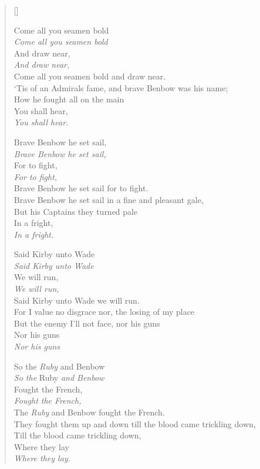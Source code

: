 \pagebreak
\settowidth{\versewidth}{‘Tis of an Admirals fame, and brave Benbow was his name;}
\begin{verse}[\versewidth]
\begin{patverse}
Come all you seamen bold\\
\textit{Come all you seamen bold}\\
And draw near,\\
\textit{And draw near,}\\
Come all you seamen bold and draw near.\\
‘Tis of an Admirals fame, and brave Benbow was his name;\\
How he fought all on the main \\
You shall hear,\\
\textit{You shall hear.}
\end{patverse}

\begin{patverse}
Brave Benbow he set sail,\\
\textit{Brave Benbow he set sail,}\\
For to fight,\\
\textit{For to fight,}\\
Brave Benbow he set sail for to fight.\\
Brave Benbow he set sail in a fine and pleasant gale,\\
But his Captains they turned pale\\
In a fright,\\
\textit{In a fright.}
\end{patverse}

\begin{patverse}
Said Kirby unto Wade\\
\textit{Said Kirby unto Wade\\}
We will run,\\
\textit{We will run,\\}
Said Kirby unto Wade we will run.\\
For I value no disgrace nor, the losing of my place\\
But the enemy I'll not face, nor his guns\\
Nor his guns\\
\textit{Nor his guns}
\end{patverse}

\begin{patverse}
So the \textit{Ruby} and Benbow\\
\textit{So the} Ruby \textit{and Benbow}\\
Fought the French,\\
\textit{Fought the French,}\\
The \textit{Ruby} and Benbow fought the French.\\
They fought them up and down till the blood came trickling down,\\
Till the blood came trickling down,\\
Where they lay\\
\textit{Where they lay.}
\end{patverse}


\end{verse}
